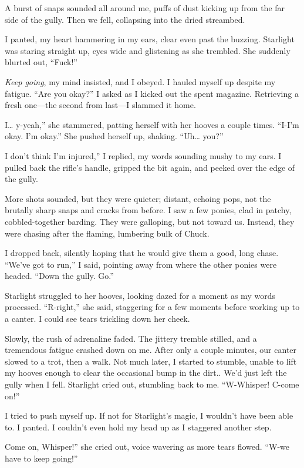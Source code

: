 A burst of snaps sounded all around me, puffs of dust kicking up from the far side of the gully. Then we fell, collapsing into the dried streambed.

I panted, my heart hammering in my ears, clear even past the buzzing. Starlight was staring straight up, eyes wide and glistening as she trembled. She suddenly blurted out, “Fuck!”

\textit{Keep going}, my mind insisted, and I obeyed. I hauled myself up despite my fatigue. “Are you okay?” I asked as I kicked out the spent magazine. Retrieving a fresh one—the second from last—I slammed it home.

\leavevmode{}I… y-yeah,” she stammered, patting herself with her hooves a couple times. “I-I’m okay. I’m okay.” She pushed herself up, shaking. “Uh… you?”

\leavevmode{}I don’t think I’m injured,” I replied, my words sounding mushy to my ears. I pulled back the rifle’s handle, gripped the bit again, and peeked over the edge of the gully.

More shots sounded, but they were quieter; distant, echoing pops, not the brutally sharp snaps and cracks from before. I saw a few ponies, clad in patchy, cobbled-together barding. They were galloping, but not toward us. Instead, they were chasing after the flaming, lumbering bulk of Chuck.

I dropped back, silently hoping that he would give them a good, long chase. “We’ve got to run,” I said, pointing away from where the other ponies were headed. “Down the gully. Go.”

Starlight struggled to her hooves, looking dazed for a moment as my words processed. “R-right,” she said, staggering for a few moments before working up to a canter. I could see tears trickling down her cheek.

Slowly, the rush of adrenaline faded. The jittery tremble stilled, and a tremendous fatigue crashed down on me. After only a couple minutes, our canter slowed to a trot, then a walk. Not much later, I started to stumble, unable to lift my hooves enough to clear the occasional bump in the dirt.. We’d just left the gully when I fell. Starlight cried out, stumbling back to me. “W-Whisper! C-come on!”

I tried to push myself up. If not for Starlight’s magic, I wouldn’t have been able to. I panted. I couldn’t even hold my head up as I staggered another step.

\leavevmode{}Come on, Whisper!” she cried out, voice wavering as more tears flowed. “W-we have to keep going!”

